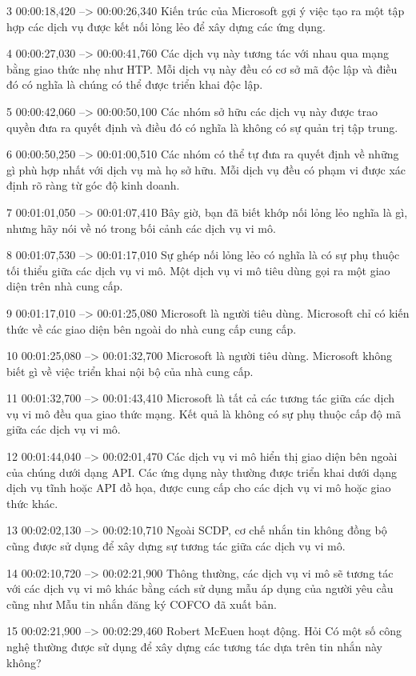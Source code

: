 3
00:00:18,420 --> 00:00:26,340
Kiến trúc của Microsoft gợi ý việc tạo ra một tập hợp các dịch vụ được kết nối lỏng lẻo để xây dựng các ứng dụng.

4
00:00:27,030 --> 00:00:41,760
Các dịch vụ này tương tác với nhau qua mạng bằng giao thức nhẹ như HTP.  Mỗi dịch vụ này đều có cơ sở mã độc lập và điều đó có nghĩa là chúng có thể được triển khai độc lập.

5
00:00:42,060 --> 00:00:50,100
Các nhóm sở hữu các dịch vụ này được trao quyền đưa ra quyết định và điều đó có nghĩa là không có sự quản trị tập trung.

6
00:00:50,250 --> 00:01:00,510
Các nhóm có thể tự đưa ra quyết định về những gì phù hợp nhất với dịch vụ mà họ sở hữu.  Mỗi dịch vụ đều có phạm vi được xác định rõ ràng từ góc độ kinh doanh.

7
00:01:01,050 --> 00:01:07,410
Bây giờ, bạn đã biết khớp nối lỏng lẻo nghĩa là gì, nhưng hãy nói về nó trong bối cảnh các dịch vụ vi mô.

8
00:01:07,530 --> 00:01:17,010
Sự ghép nối lỏng lẻo có nghĩa là có sự phụ thuộc tối thiểu giữa các dịch vụ vi mô.  Một dịch vụ vi mô tiêu dùng gọi ra một giao diện trên nhà cung cấp.

9
00:01:17,010 --> 00:01:25,080
Microsoft là người tiêu dùng.  Microsoft chỉ có kiến ​​thức về các giao diện bên ngoài do nhà cung cấp cung cấp.

10
00:01:25,080 --> 00:01:32,700
Microsoft là người tiêu dùng.  Microsoft không biết gì về việc triển khai nội bộ của nhà cung cấp.

11
00:01:32,700 --> 00:01:43,410
Microsoft là tất cả các tương tác giữa các dịch vụ vi mô đều qua giao thức mạng.  Kết quả là không có sự phụ thuộc cấp độ mã giữa các dịch vụ vi mô.

12
00:01:44,040 --> 00:02:01,470
Các dịch vụ vi mô hiển thị giao diện bên ngoài của chúng dưới dạng API.  Các ứng dụng này thường được triển khai dưới dạng dịch vụ tĩnh hoặc API đồ họa, được cung cấp cho các dịch vụ vi mô hoặc giao thức khác.

13
00:02:02,130 --> 00:02:10,710
Ngoài SCDP, cơ chế nhắn tin không đồng bộ cũng được sử dụng để xây dựng sự tương tác giữa các dịch vụ vi mô.

14
00:02:10,720 --> 00:02:21,900
Thông thường, các dịch vụ vi mô sẽ tương tác với các dịch vụ vi mô khác bằng cách sử dụng mẫu áp dụng của người yêu cầu cũng như Mẫu tin nhắn đăng ký COFCO đã xuất bản.

15
00:02:21,900 --> 00:02:29,460
Robert McEuen hoạt động.  Hỏi Có một số công nghệ thường được sử dụng để xây dựng các tương tác dựa trên tin nhắn này không?

